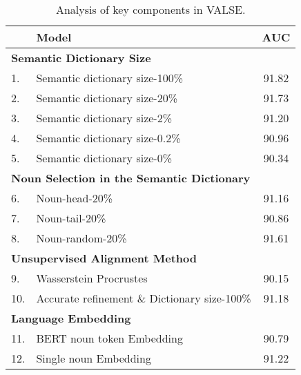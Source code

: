 \documentclass[letterpaper]{article} \usepackage{aaai24}  \usepackage{times}  \usepackage{helvet}  \usepackage{courier}  \usepackage[hyphens]{url}  \usepackage{graphicx} \urlstyle{rm} \def\UrlFont{\rm}  \usepackage{natbib}  \usepackage{caption} \frenchspacing  \setlength{\pdfpagewidth}{8.5in}  \setlength{\pdfpageheight}{11in}
\begin{document}
\begin{table}[t]
\centering
\scalebox{1.1}
{\scriptsize
\renewcommand\arraystretch{1.1}
\begin{tabular}{ll|c}
\toprule
                          & \textbf{Model}                                           & \textbf{AUC} \\ \hline
\multicolumn{2}{l|}{\textbf{Semantic Dictionary Size}} &                                      \\
\multicolumn{1}{l}{1.}  & \multicolumn{1}{l|}{Semantic dictionary size-100\%}                    &    91.82          \\
\multicolumn{1}{l}{2.}  & \multicolumn{1}{l|}{Semantic dictionary size-20\%}                     &    91.73          \\
\multicolumn{1}{l}{3.}  & \multicolumn{1}{l|}{Semantic dictionary size-2\%}                      &    91.20          \\
\multicolumn{1}{l}{4.}  & \multicolumn{1}{l|}{Semantic dictionary size-0.2\%}                    &    90.96          \\
\multicolumn{1}{l}{5.}  & \multicolumn{1}{l|}{Semantic dictionary size-0\%}                        &    90.34          \\
\multicolumn{2}{l|}{\textbf{Noun Selection in the Semantic Dictionary}} &                               \\
\multicolumn{1}{l}{6.}  & \multicolumn{1}{l|}{Noun-head-20\%}                &    91.16          \\
\multicolumn{1}{l}{7.}  & \multicolumn{1}{l|}{Noun-tail-20\%}                &    90.86          \\
\multicolumn{1}{l}{8.} & \multicolumn{1}{l|}{Noun-random-20\%}              &    91.61          \\ 
\multicolumn{2}{l|}{\textbf{Unsupervised Alignment Method}} &                                       \\
\multicolumn{1}{l}{9.}  & \multicolumn{1}{l|}{Wasserstein Procrustes}              &    90.15          \\
\multicolumn{1}{l}{10.}  & \multicolumn{1}{l|}{Accurate refinement  \& Dictionary size-100\%} &    91.18          \\ 
\multicolumn{2}{l|}{\textbf{Language Embedding}} &                               \\
\multicolumn{1}{l}{11.}  & \multicolumn{1}{l|}{BERT noun token Embedding}                    &   90.79          \\
\multicolumn{1}{l}{12.} & \multicolumn{1}{l|}{Single noun Embedding}              &    91.22          \\ 
\bottomrule
\end{tabular}}
\caption{Analysis of key components in VALSE.}
\vspace{-5pt}
\label{tab:ablation3}
\end{table}
\end{document}
